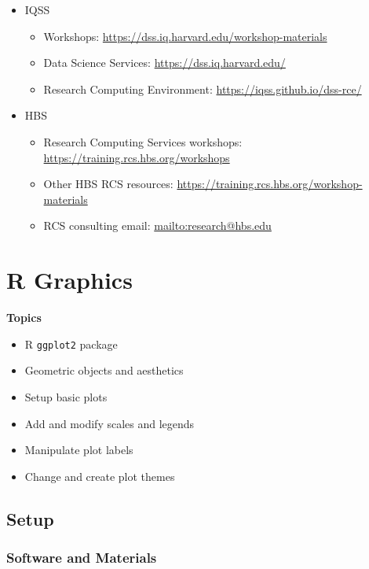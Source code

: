\documentclass[
]{book}
\providecommand{\tightlist}{%
  \setlength{\itemsep}{0pt}\setlength{\parskip}{0pt}}
\begin{document}
\begin{itemize}
\tightlist
\item
  IQSS

  \begin{itemize}
  \tightlist
  \item
    Workshops: \url{https://dss.iq.harvard.edu/workshop-materials}
  \item
    Data Science Services: \url{https://dss.iq.harvard.edu/}
  \item
    Research Computing Environment: \url{https://iqss.github.io/dss-rce/}
  \end{itemize}
\item
  HBS

  \begin{itemize}
  \tightlist
  \item
    Research Computing Services workshops: \url{https://training.rcs.hbs.org/workshops}
  \item
    Other HBS RCS resources: \url{https://training.rcs.hbs.org/workshop-materials}
  \item
    RCS consulting email: \url{mailto:research@hbs.edu}
  \end{itemize}
\end{itemize}

\hypertarget{r-graphics}{%
\chapter{R Graphics}\label{r-graphics}}

\textbf{Topics}

\begin{itemize}
\tightlist
\item
  R \texttt{ggplot2} package
\item
  Geometric objects and aesthetics
\item
  Setup basic plots
\item
  Add and modify scales and legends
\item
  Manipulate plot labels
\item
  Change and create plot themes
\end{itemize}

\hypertarget{setup-2}{%
\section{Setup}\label{setup-2}}

\hypertarget{software-and-materials-2}{%
\subsection{Software and Materials}\label{software-and-materials-2}}
\end{document}
